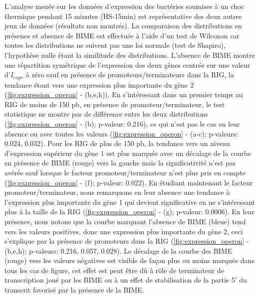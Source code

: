 \documentclass[12pt,a4paper]{report}
\begin{document}
\begin{onehalfspace}
L'analyse menée sur les données d'expression des bactéries soumises à un choc thermique pendant 15 minutes (HS-15min) est représentative des deux autres jeux de données (résultats non montrés). La comparaison des distributions en présence et absence de BIME est effectuée à l'aide d'un test de Wilcoxon car toutes les distributions ne suivent pas une loi normale (test de Shapiro), l'hypothèse nulle étant la similitude des distributions. L'absence de BIME montre une répartition symétrique de l'expression des deux gènes centrée sur une valeur d'$I_{expr}$ à zéro sauf en présence de promoteurs/terminateurs dans la RIG, la tendance étant vers une expression plus importante du gène 2 (\autoref{fig:expression_operon} - (b,e,h)).
En s'intéressant dans un premier temps au RIG de moins de 150 pb, en présence de promoteur/terminateur, le test statistique ne montre pas de différence entre les deux distributions (\autoref{fig:expression_operon} - (b); p-valeur: 0.216), ce qui n'est pas le cas en leur absence ou avec toutes les valeurs (\autoref{fig:expression_operon} - (a-c); p-valeurs: 0.024, 0.032). 
Pour les RIG de plus de 150 pb, la tendance vers un niveau d'expression supérieur du gène 1 est plus marquée avec un décalage de la courbe en présence de BIME (rouge) vers la gauche mais la significativité n'est pas avérée sauf lorsque le facteur promoteur/terminateur n'est plus pris en compte  (\autoref{fig:expression_operon} - (f); p-valeur: 0.022). 
En étudiant maintenant le facteur promoteur/terminateur, nous remarquons en leur absence une tendance à l'expression plus importante du gène 1 qui devient significative en ne s'intéressant plus à la taille de la RIG (\autoref{fig:expression_operon} - (g); p-valeur: 0.0006). En leur présence, nous notons que la courbe marquant l'absence de BIME (bleue) tend vers les valeurs positives, donc une expression plus importante du gène 2, ceci s'explique par la présence de promoteurs dans la RIG (\autoref{fig:expression_operon} - (b,e,h); p-valeurs: 0.216, 0.057, 0.028). Le décalage de la courbe des BIME (rouge) vers les valeurs négatives est visible de façon plus ou moins marquée dans tous les cas de figure, cet effet est peut être dû à rôle de terminateur de transcription joué par les BIME ou à un effet de stabilisation de la partie 5' du transcrit favorisé par la présence de la BIME.


\end{onehalfspace}
\end{document}
